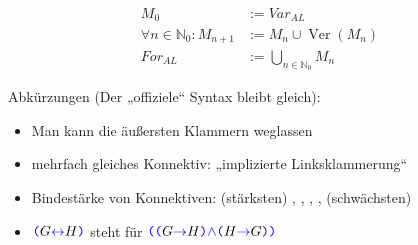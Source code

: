 \begin{definition}
  \begin{align*}
    M_0 &:= \textit{Var}_{AL} \\
    \forall n \in \mathbb{N}_0: M_{n+1} &:= M_n \cup \operatorname{Ver}(M_n) \\
    For_{AL} &:= \bigcup_{n \in \mathbb{N}_0} M_n
  \end{align*}
\end{definition}

\begin{notation}
  Abkürzungen (Der „offiziele“ Syntax bleibt gleich):
  \begin{itemize}
  \item Man kann die äußersten Klammern weglassen
  \item mehrfach gleiches Konnektiv: „implizierte Linksklammerung“
  \item Bindestärke von Konnektiven: (stärksten) \mathstring{\neg}, \mathstring{\wedge}, \mathstring{\vee}, \mathstring{\to}, \mathstring{\leftrightarrow} (schwächsten)
  \item $\texttt{\color{blue}(} G \mathtt{\color{blue}\leftrightarrow} H \texttt{\color{blue})}$ steht für $\texttt{\color{blue}(} \texttt{\color{blue}(} G \mathtt{\color{blue}\to} H \texttt{\color{blue})} \mathtt{\color{blue}\wedge} \texttt{\color{blue}(} H \mathtt{\color{blue}\to} G \texttt{\color{blue})} \texttt{\color{blue})}$
  \end{itemize}
\end{notation}

